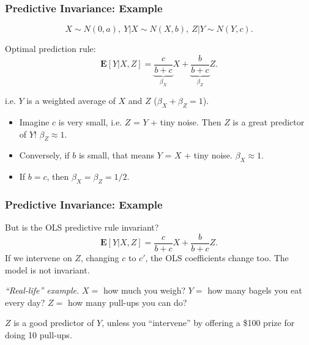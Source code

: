 \documentclass{beamer}
\newcommand{\E}{\textbf{E}}
\begin{document}
\begin{frame}
\frametitle{Predictive Invariance: Example}
\begin{center}
\[X \sim N(0, a),\ Y|X \sim N(X, b),\ Z|Y \sim N(Y, c).\]
\end{center}

Optimal prediction rule:
\[
\E[Y|X, Z] = \underbrace{\frac{c}{b+c}}_{\beta_X} X + \underbrace{\frac{b}{b+c}}_{\beta_Z} Z.
\]

i.e. $Y$ is a weighted average of $X$ and $Z$ ($\beta_X + \beta_Z = 1$).

\begin{itemize}
\item Imagine $c$ is very small, i.e. $Z$ = $Y$ + tiny noise.  Then $Z$ is a great predictor of $Y$!  $\beta_Z \approx 1$.
\item Conversely, if $b$ is small, that means $Y$ = $X$ + tiny noise.  $\beta_X \approx 1$.
\item If $b = c$, then $\beta_X = \beta_Z = 1/2$.
\end{itemize}

\end{frame}






\begin{frame}
\frametitle{Predictive Invariance: Example}

But is the OLS predictive rule invariant?
\[
\E[Y|X, Z] = \frac{c}{b + c} X + \frac{b}{b+c} Z.
\]
If we intervene on $Z$, changing $c$ to $c'$, the OLS coefficients change too.
The model is not invariant.

\begin{center}
\end{center}

\emph{``Real-life'' example.}
$X = $ how much you weigh? $Y = $ how many bagels you eat every day? $Z= $ how many pull-ups you can do?

$Z$ is a good predictor of $Y$, unless you ``intervene'' by offering a \$100 prize for doing 10 pull-ups.

\end{frame}
\end{document}
